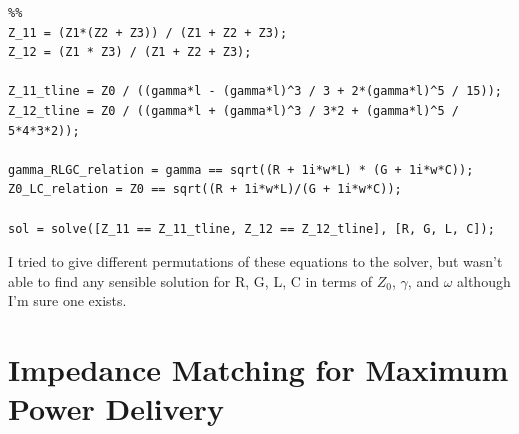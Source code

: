 \documentclass[11pt]{article}
\begin{document}
\begin{enumerate}
\begin{verbatim}
%%
Z_11 = (Z1*(Z2 + Z3)) / (Z1 + Z2 + Z3);
Z_12 = (Z1 * Z3) / (Z1 + Z2 + Z3);

Z_11_tline = Z0 / ((gamma*l - (gamma*l)^3 / 3 + 2*(gamma*l)^5 / 15));
Z_12_tline = Z0 / ((gamma*l + (gamma*l)^3 / 3*2 + (gamma*l)^5 / 5*4*3*2));

gamma_RLGC_relation = gamma == sqrt((R + 1i*w*L) * (G + 1i*w*C));
Z0_LC_relation = Z0 == sqrt((R + 1i*w*L)/(G + 1i*w*C));

sol = solve([Z_11 == Z_11_tline, Z_12 == Z_12_tline], [R, G, L, C]);
	\end{verbatim}
	
	I tried to give different permutations of these equations to the solver, but wasn't able to find any sensible solution for R, G, L, C in terms of $Z_0$, $\gamma$, and $\omega$ although I'm sure one exists.

\end{enumerate}

\section{Impedance Matching for Maximum Power Delivery}
\end{document}
